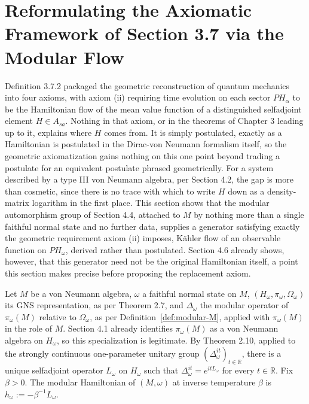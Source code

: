 \section{Reformulating the Axiomatic Framework of Section 3.7 via the Modular Flow}\label{sec:axioms-modular}

Definition 3.7.2 packaged the geometric reconstruction of quantum mechanics into four axioms, with axiom (ii) requiring time evolution on each sector $PH_\alpha$ to be the Hamiltonian flow of the mean value function of a distinguished selfadjoint element $H \in A_{sa}$. Nothing in that axiom, or in the theorems of Chapter 3 leading up to it, explains where $H$ comes from. It is simply postulated, exactly as a Hamiltonian is postulated in the Dirac-von Neumann formalism itself, so the geometric axiomatization gains nothing on this one point beyond trading a postulate for an equivalent postulate phrased geometrically. For a system described by a type III von Neumann algebra, per Section 4.2, the gap is more than cosmetic, since there is no trace with which to write $H$ down as a density-matrix logarithm in the first place. This section shows that the modular automorphism group of Section 4.4, attached to $M$ by nothing more than a single faithful normal state and no further data, supplies a generator satisfying exactly the geometric requirement axiom (ii) imposes, Kähler flow of an observable function on $PH_\omega$, derived rather than postulated. Section 4.6 already shows, however, that this generator need not be the original Hamiltonian itself, a point this section makes precise before proposing the replacement axiom.

\begin{definition}\label{def:modular-hamiltonian}
	Let $M$ be a von Neumann algebra, $\omega$ a faithful normal state on $M$, $(H_\omega,\pi_\omega,\Omega_\omega)$ its GNS representation, as per Theorem 2.7, and $\Delta_\omega$ the modular operator of $\pi_\omega(M)$ relative to $\Omega_\omega$, as per Definition~\ref{def:modular-M}, applied with $\pi_\omega(M)$ in the role of $M$. Section 4.1 already identifies $\pi_\omega(M)$ as a von Neumann algebra on $H_\omega$, so this specialization is legitimate. By Theorem 2.10, applied to the strongly continuous one-parameter unitary group $(\Delta_\omega^{it})_{t \in \mathbb{R}}$, there is a unique selfadjoint operator $L_\omega$ on $H_\omega$ such that $\Delta_\omega^{it} = e^{itL_\omega}$ for every $t \in \mathbb{R}$. Fix $\beta > 0$. The modular Hamiltonian of $(M,\omega)$ at inverse temperature $\beta$ is $h_\omega := -\beta^{-1}L_\omega$.
\end{definition}

